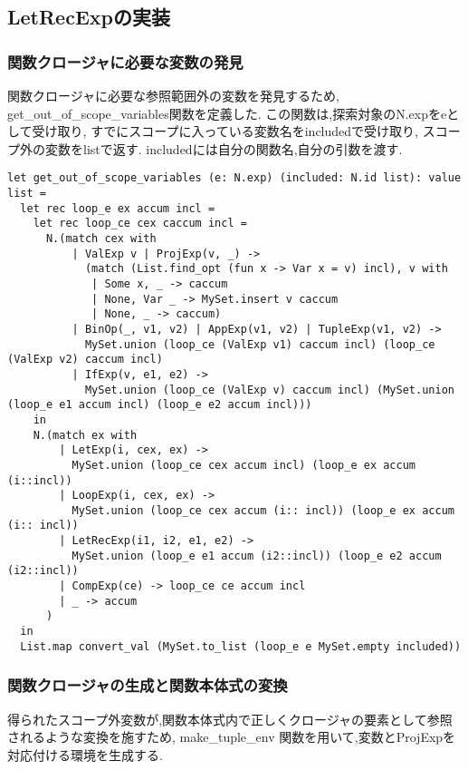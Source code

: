 \subsection*{LetRecExpの実装}

\subsubsection*{関数クロージャに必要な変数の発見}

関数クロージャに必要な参照範囲外の変数を発見するため,
get\_out\_of\_scope\_variables関数を定義した.
この関数は,探索対象のN.expをeとして受け取り, 
すでにスコープに入っている変数名をincludedで受け取り,
スコープ外の変数をlistで返す. includedには自分の関数名,自分の引数を渡す.

\begin{lstlisting}[caption=スコープ外変数の発見]
  let get_out_of_scope_variables (e: N.exp) (included: N.id list): value list = 
  let rec loop_e ex accum incl = 
    let rec loop_ce cex caccum incl = 
      N.(match cex with
          | ValExp v | ProjExp(v, _) ->
            (match (List.find_opt (fun x -> Var x = v) incl), v with
             | Some x, _ -> caccum
             | None, Var _ -> MySet.insert v caccum
             | None, _ -> caccum)
          | BinOp(_, v1, v2) | AppExp(v1, v2) | TupleExp(v1, v2) -> 
            MySet.union (loop_ce (ValExp v1) caccum incl) (loop_ce (ValExp v2) caccum incl)
          | IfExp(v, e1, e2) ->
            MySet.union (loop_ce (ValExp v) caccum incl) (MySet.union (loop_e e1 accum incl) (loop_e e2 accum incl)))
    in 
    N.(match ex with
        | LetExp(i, cex, ex) -> 
          MySet.union (loop_ce cex accum incl) (loop_e ex accum (i::incl))
        | LoopExp(i, cex, ex) -> 
          MySet.union (loop_ce cex accum (i:: incl)) (loop_e ex accum (i:: incl))
        | LetRecExp(i1, i2, e1, e2) -> 
          MySet.union (loop_e e1 accum (i2::incl)) (loop_e e2 accum (i2::incl))
        | CompExp(ce) -> loop_ce ce accum incl
        | _ -> accum
      )
  in
  List.map convert_val (MySet.to_list (loop_e e MySet.empty included))  
\end{lstlisting}

\subsubsection*{関数クロージャの生成と関数本体式の変換}

得られたスコープ外変数が,関数本体式内で正しくクロージャの要素として参照されるような変換を施すため, make\_tuple\_env 関数を用いて,変数とProjExpを対応付ける環境を生成する.

